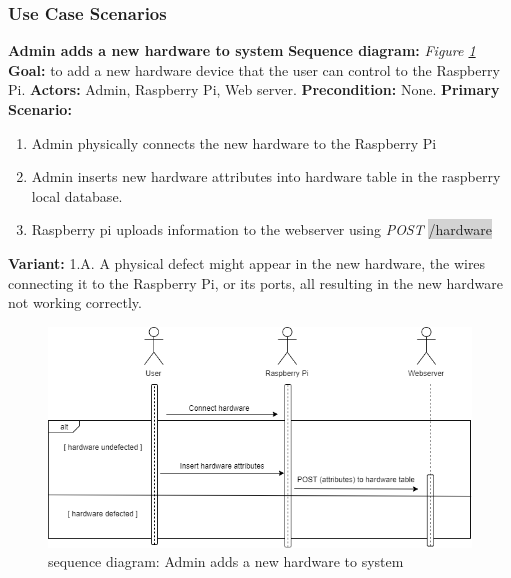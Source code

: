 \documentclass[12pt, oneside, a4paper]{book}
\newcommand{\code}[1]{{\color{red}\colorbox{lightgray}{#1}}}
\newcommand\boldcolor[1]{\textcolor{bold}{\textbf{#1}}}
\begin{document}
				\newpage\subsubsection{Use Case Scenarios}
				\boldcolor{Admin adds a new hardware to system}
				\newline\textbf{Sequence diagram:} \textit{Figure \ref{admin_hw}}
				\newline\textbf{Goal:} to add a new hardware device that the user can control to the Raspberry Pi.
				\newline\textbf{Actors:} Admin, Raspberry Pi, Web server.
				\newline\textbf{Precondition:} None.
				\newline\textbf{Primary Scenario:}	
				\begin{enumerate}[label*=\arabic*.]
					\item Admin physically connects the new hardware to the Raspberry Pi
					\item Admin inserts new hardware attributes into hardware table in the raspberry local database. 
					\item Raspberry pi uploads information to the webserver using \textit{POST} \code{/hardware}
				\end{enumerate}
				\textbf{Variant:}\newline
				\hspace*{5mm}1.A. A physical defect might appear in the new hardware, the wires connecting it to the Raspberry Pi, or its ports, all resulting in the new hardware not working correctly. \\
				\begin{figure}[H]
					\includegraphics[width=\linewidth]{img/sequence_add_hardware.png}
					\caption{sequence diagram: Admin adds a new hardware to system}
					\label{admin_hw}
				\end{figure} 
\end{document}
